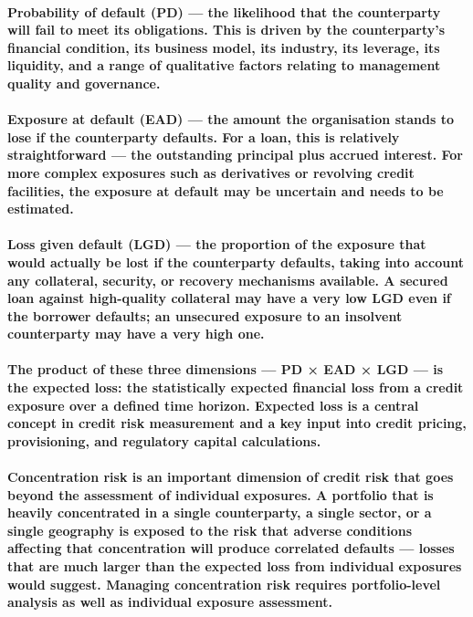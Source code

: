\paragraph{\textbf{Probability of default (PD)} — the likelihood that the counterparty will fail to meet its obligations. This is driven by the counterparty's financial condition, its business model, its industry, its leverage, its liquidity, and a range of qualitative factors relating to management quality and governance.}
\paragraph{\textbf{Exposure at default (EAD)} — the amount the organisation stands to lose if the counterparty defaults. For a loan, this is relatively straightforward — the outstanding principal plus accrued interest. For more complex exposures such as derivatives or revolving credit facilities, the exposure at default may be uncertain and needs to be estimated.}
\paragraph{\textbf{Loss given default (LGD)} — the proportion of the exposure that would actually be lost if the counterparty defaults, taking into account any collateral, security, or recovery mechanisms available. A secured loan against high-quality collateral may have a very low LGD even if the borrower defaults; an unsecured exposure to an insolvent counterparty may have a very high one.}
\paragraph{The product of these three dimensions — PD × EAD × LGD — is the expected loss: the statistically expected financial loss from a credit exposure over a defined time horizon. Expected loss is a central concept in credit risk measurement and a key input into credit pricing, provisioning, and regulatory capital calculations.}
\paragraph{\textbf{Concentration risk} is an important dimension of credit risk that goes beyond the assessment of individual exposures. A portfolio that is heavily concentrated in a single counterparty, a single sector, or a single geography is exposed to the risk that adverse conditions affecting that concentration will produce correlated defaults — losses that are much larger than the expected loss from individual exposures would suggest. Managing concentration risk requires portfolio-level analysis as well as individual exposure assessment.}

